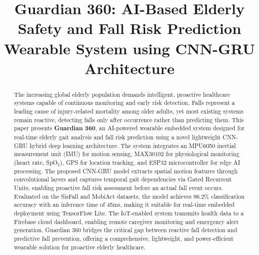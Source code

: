 \documentclass[conference]{IEEEtran}
\begin{document}
\title{Guardian 360: AI-Based Elderly Safety and Fall Risk Prediction Wearable System using CNN-GRU Architecture}

\author{
\and
{}
}

\maketitle

\begin{abstract}
The increasing global elderly population demands intelligent, proactive healthcare systems capable of continuous monitoring and early risk detection. Falls represent a leading cause of injury-related mortality among older adults, yet most existing systems remain reactive, detecting falls only after occurrence rather than predicting them. This paper presents \textbf{Guardian 360}, an AI-powered wearable embedded system designed for real-time elderly gait analysis and fall risk prediction using a novel lightweight CNN-GRU hybrid deep learning architecture. The system integrates an MPU6050 inertial measurement unit (IMU) for motion sensing, MAX30102 for physiological monitoring (heart rate, SpO$_2$), GPS for location tracking, and ESP32 microcontroller for edge AI processing. The proposed CNN-GRU model extracts spatial motion features through convolutional layers and captures temporal gait dependencies via Gated Recurrent Units, enabling proactive fall risk assessment before an actual fall event occurs. Evaluated on the SisFall and MobiAct datasets, the model achieves 96.2\% classification accuracy with an inference time of 45ms, making it suitable for real-time embedded deployment using TensorFlow Lite. The IoT-enabled system transmits health data to a Firebase cloud dashboard, enabling remote caregiver monitoring and emergency alert generation. Guardian 360 bridges the critical gap between reactive fall detection and predictive fall prevention, offering a comprehensive, lightweight, and power-efficient wearable solution for proactive elderly healthcare.
\end{abstract}
\end{document}
